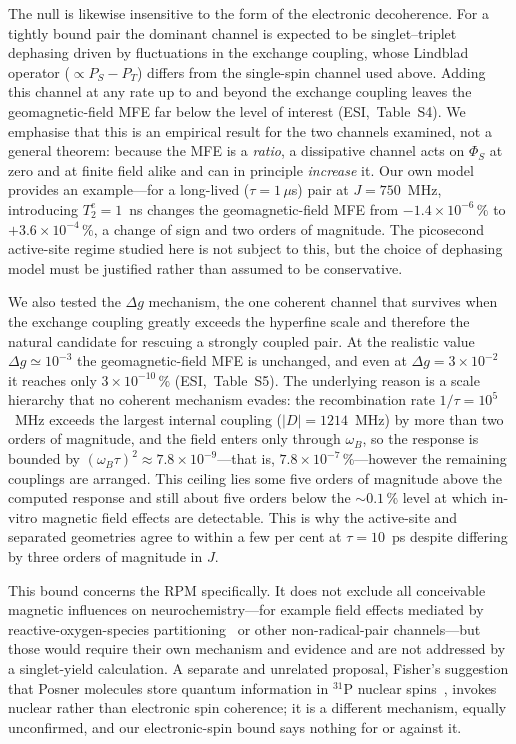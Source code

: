 \documentclass[twoside,twocolumn,9pt]{article}
\begin{document}
The null is likewise insensitive to the form of the electronic decoherence. For a
tightly bound pair the dominant channel is expected to be singlet--triplet
dephasing driven by fluctuations in the exchange coupling, whose Lindblad
operator ($\propto P_S - P_T$) differs from the single-spin channel used above.
Adding this channel at any rate up to and beyond the exchange coupling leaves the
geomagnetic-field MFE far below the level of interest (ESI,\dag~Table~S4). We emphasise that this is an empirical result for the two channels
examined, not a general theorem: because the MFE is a \emph{ratio}, a dissipative
channel acts on $\Phi_S$ at zero and at finite field alike and can in principle
\emph{increase} it. Our own model provides an example---for a long-lived
($\tau = 1\,\mu$s) pair at $J = 750$~MHz, introducing $T_2^e = 1$~ns changes the
geomagnetic-field MFE from $-1.4\times10^{-6}\,\%$ to $+3.6\times10^{-4}\,\%$, a
change of sign and two orders of magnitude. The picosecond active-site regime
studied here is not subject to this, but the choice of dephasing model must be
justified rather than assumed to be conservative.

We also tested the $\Delta g$ mechanism, the one coherent channel that survives
when the exchange coupling greatly exceeds the hyperfine scale and therefore the
natural candidate for rescuing a strongly coupled pair. At the realistic value
$\Delta g \simeq 10^{-3}$ the geomagnetic-field MFE is unchanged, and even at
$\Delta g = 3\times10^{-2}$ it reaches only $3\times10^{-10}\,\%$ (ESI,\dag~Table~S5). The underlying reason is a scale hierarchy that no
coherent mechanism evades: the recombination rate $1/\tau = 10^{5}$~MHz exceeds
the largest internal coupling ($|D| = 1214$~MHz) by more than two orders of
magnitude, and the field enters only through $\omega_B$, so the response is
bounded by $(\omega_B\tau)^2 \approx 7.8\times10^{-9}$---that is,
$7.8\times10^{-7}\,\%$---however the remaining couplings are arranged. This
ceiling lies some five orders of magnitude above the computed response and still
about five orders below the $\sim\!0.1\,\%$ level at which in-vitro magnetic
field effects are detectable. This is why the active-site and separated geometries
agree to within a few per cent at $\tau = 10$~ps despite differing by three
orders of magnitude in $J$.

This bound concerns the RPM specifically. It does not exclude all conceivable
magnetic influences on neurochemistry---for example field effects mediated by
reactive-oxygen-species partitioning~\cite{Usselman2016,Player2019} or other
non-radical-pair channels---but those would require their own mechanism and
evidence and are not addressed by a singlet-yield calculation. A separate and
unrelated proposal, Fisher's suggestion that Posner molecules store quantum
information in $^{31}$P nuclear spins~\cite{Fisher2015}, invokes nuclear rather
than electronic spin coherence; it is a different mechanism, equally unconfirmed,
and our electronic-spin bound says nothing for or against it.
\end{document}
